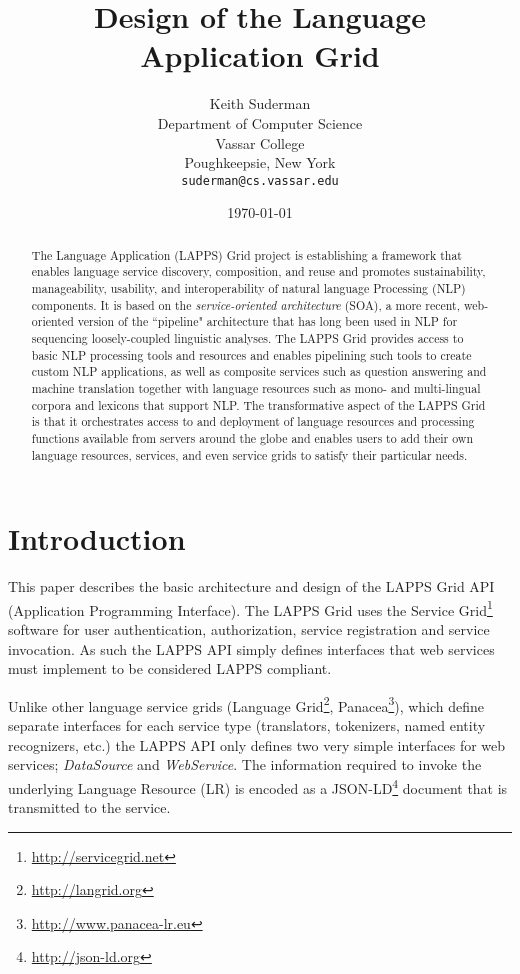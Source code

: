 \documentclass{article}
\newcommand{\lapps}{LAPPS\xspace}
\newcommand{\source}{\emph{DataSource}\xspace}
\newcommand{\service}{\emph{WebService}\xspace}
\begin{document}
\title{Design of the Language Application Grid}
\author{Keith Suderman\\
Department of Computer Science\\
Vassar College\\
Poughkeepsie, New York\\
\texttt{suderman@cs.vassar.edu}}
\date{\today}
\maketitle

\begin{abstract}
The Language Application (LAPPS) Grid project
is establishing a
framework that enables language service discovery, composition, and reuse and promotes sustainability, manageability, usability, and interoperability of natural language Processing (NLP) components. It is based on the {\it service-oriented architecture} (SOA), a more recent, web-oriented version of the  ``pipeline" architecture that has long been used in NLP for sequencing loosely-coupled linguistic analyses. 
The LAPPS Grid provides access to basic NLP processing tools and resources and enables pipelining such tools to create custom NLP applications, as well as
composite services such as question answering and machine translation together with language resources such as mono- and multi-lingual corpora and lexicons that support NLP. 
The transformative aspect of the LAPPS Grid is that it orchestrates  access to and deployment of language resources and processing functions available from servers around the globe and enables users to add their own language resources, services, and even service grids to satisfy their particular needs.
\end{abstract}

\section{Introduction}

This paper describes the basic architecture and design of the \lapps Grid API (Application Programming Interface). The \lapps Grid uses the Service Grid\footnote{\url{http://servicegrid.net}} software for user authentication, authorization, service registration and service invocation. As such the \lapps API simply defines interfaces that web services must implement to be considered \lapps compliant.

Unlike other language service grids (Language Grid\footnote{\url{http://langrid.org}}, Panacea\footnote{\url{http://www.panacea-lr.eu}}), which define separate interfaces for each service type (translators, tokenizers, named entity recognizers, etc.) the \lapps API only defines two very simple interfaces for web services; \source and \service. The information required to invoke the underlying Language Resource (LR) is encoded as a JSON-LD\footnote{\url{http://json-ld.org}} document that is transmitted to the service.
\end{document}
